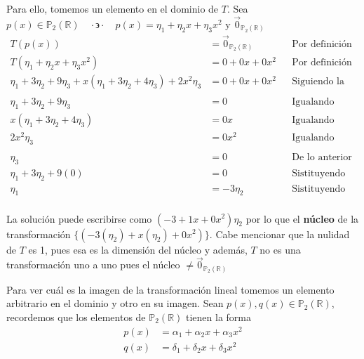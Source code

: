\documentclass[letterpaper]{article}
\newcommand{\tq}{ \quad \cdot  \backepsilon \cdot \quad }
\newcommand{\Po}{\mathds{P}_2(\mathds{R})}
\renewcommand{\*}{\cdot}
\theoremstyle{definition}
\begin{document}
Para ello, tomemos un elemento en el dominio de $ T $. Sea $ p(x) \in \Po \tq p(x) = \eta_1 + \eta_2x + \eta_3x^2 $ y $ \vec{0}_{\Po} $
\begin{align*}
	T(p(x)) &= \vec{0}_{\Po} && \text{Por definición del núcleo}\\
	T(\eta_1 + \eta_2x + \eta_3x^2) &= 0 + 0x + 0x^2 && \text{Por definición de los elementos}\\
	\eta_1 + 3\eta_2 + 9\eta_3 + x(\eta_1 + 3 \eta_2 + 4 \eta_3) + 2 x^2\eta_3 &= 0 + 0x + 0x^2 && \text{Siguiendo la regla de correspondencia}\\
	\\
	\eta_1 + 3\eta_2 + 9\eta_3  &= 0 && \text{Igualando entrada a entrada}\\
	x(\eta_1 + 3 \eta_2 + 4 \eta_3) &= 0x&& \text{Igualando entrada a entrada}\\
	2 x^2\eta_3 &= 0x^2 && \text{Igualando entrada a entrada}\\
	\\
	\eta_3 &= 0 && \text{De lo anterior}\\
	\eta_1 + 3\eta_2 + 9(0) &= 0 && \text{Sistituyendo}\\
	\eta_1  &= - 3\eta_2 && \text{Sistituyendo}\\
\end{align*}
\begin{center}
	La solución puede escribirse como $ (-3 + 1x + 0x^2 ) \eta_2 $ por lo que el \textbf{núcleo} de la transformación $ \{(-3(\eta_2) + x(\eta_2) + 0x^2)\} $. Cabe mencionar que la nulidad de $ T $ es 1, pues esa es la dimensión del núcleo y además, $ T $ no es una transformación uno a uno pues el núcleo $ \neq \vec{0}_{\Po} $
\end{center}

Para ver cuál es la imagen de la transformación lineal tomemos un elemento arbitrario en el dominio y otro en su imagen. Sean $ p(x), q(x) \in \Po $, recordemos que los elementos de $ \Po $ tienen la forma
\begin{align*}
p(x) & =\alpha_1 + \alpha_2x + \alpha_3x^2\\
q(x) & =\delta_1 + \delta_2x + \delta_3x^2
\end{align*}
\end{document}
